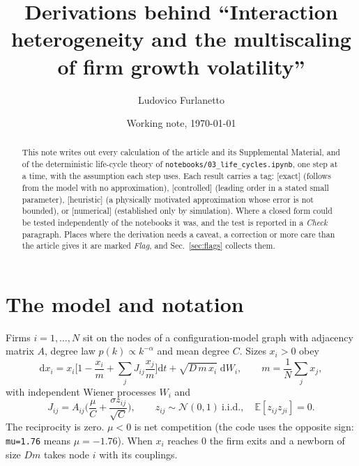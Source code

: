 \documentclass[11pt]{article}
\newcommand{\E}{\mathbb E}
\newcommand{\dd}{\mathrm d}
\newcommand{\exact}{\textsf{\small[exact]}}
\newcommand{\controlled}{\textsf{\small[controlled]}}
\newcommand{\heur}{\textsf{\small[heuristic]}}
\newcommand{\numer}{\textsf{\small[numerical]}}
\begin{document}
\title{Derivations behind ``Interaction heterogeneity and the multiscaling of firm growth volatility''}
\author{Ludovico Furlanetto}
\date{Working note, \today}
\maketitle

\begin{abstract}
This note writes out every calculation of the article and its Supplemental Material, and of the
deterministic life-cycle theory of \texttt{notebooks/03\_life\_cycles.ipynb}, one step at a time, with
the assumption each step uses.  Each result carries a tag: \exact{} (follows from the model with no
approximation), \controlled{} (leading order in a stated small parameter), \heur{} (a physically motivated
approximation whose error is not bounded), or \numer{} (established only by simulation).  Where a closed
form could be tested independently of the notebooks it was, and the test is reported in a \emph{Check}
paragraph.  Places where the derivation needs a caveat, a correction or more care than the article gives
it are marked \emph{Flag}, and Sec.~\ref{sec:flags} collects them.
\end{abstract}

\tableofcontents

\section{The model and notation}
\label{sec:model}

Firms $i=1,\dots,N$ sit on the nodes of a configuration-model graph with adjacency matrix $A$, degree law
$p(k)\propto k^{-\alpha}$ and mean degree $C$.  Sizes $x_i>0$ obey
\begin{equation}
\dd x_i=x_i\Big[1-\frac{x_i}{m}+\sum_jJ_{ij}\frac{x_j}{m}\Big]\dd t+\sqrt{D\,m\,x_i}\;\dd W_i,\qquad
m=\frac1N\sum_jx_j,
\label{eq:model}
\end{equation}
with independent Wiener processes $W_i$ and
\begin{equation}
J_{ij}=A_{ij}\Big(\frac{\mu}{C}+\frac{\sigma z_{ij}}{\sqrt C}\Big),\qquad z_{ij}\sim\mathcal N(0,1)\ \text{i.i.d.},\quad
\E[z_{ij}z_{ji}]=0 .
\label{eq:J}
\end{equation}
The reciprocity is zero.  $\mu<0$ is net competition (the code uses the opposite sign: \texttt{mu=1.76}
means $\mu=-1.76$).  When $x_i$ reaches $0$ the firm exits and a newborn of size $Dm$ takes node $i$ with
its couplings.
\end{document}
